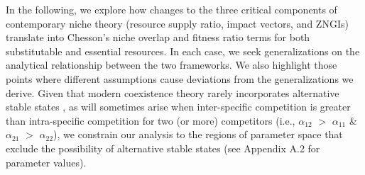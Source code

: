 In the following, we explore how changes to the three critical components of contemporary niche theory (resource supply ratio, impact vectors, and ZNGIs) translate into Chesson's niche overlap and fitness ratio terms for both substitutable and essential resources. In each case, we seek generalizations on the analytical relationship between the two frameworks. We also highlight those points where different assumptions cause deviations from the generalizations we derive. Given that modern coexistence theory rarely incorporates alternative stable states \citep[but see][]{Chesson2008}, as will sometimes arise when inter-specific competition is greater than intra-specific competition for two (or more) competitors (i.e., $\alpha_{12}$ $>$ $\alpha_{11}$ \& $\alpha_{21}$ $>$ $\alpha_{22}$), we constrain our analysis to the regions of parameter space that exclude the possibility of alternative stable states (see Appendix A.2 for parameter values).
\par



